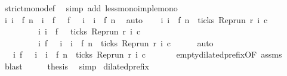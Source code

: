\begin{isabellebody}
\ strict{\isacharunderscore}mono{\isacharunderscore}def\ \isamarkupfalse%
\ {\isacharparenleft}simp\ add{\isacharcolon}\ less{\isacharunderscore}mono{\isacharunderscore}imp{\isacharunderscore}le{\isacharunderscore}mono{\isacharparenright}\isanewline
\ \ \isamarkupfalse%
\ {\isacartoucheopen}{\isasymforall}i{\isachardot}\ i\ {\isasymle}\ f\ n\ {\isacharequal}\ {\isacharparenleft}i\ {\isacharless}\ f\ {}{\isacharparenright}\ {\isasymor}\ {\isacharparenleft}f\ {}\ {\isasymle}\ i\ {\isasymand}\ i\ {\isasymle}\ f\ n{\isacharparenright}{\isacartoucheclose}\ \isamarkupfalse%
\ auto\isanewline
\ \ \isamarkupfalse%
\ {\isacartoucheopen}{\isacharbraceleft}i{\isachardot}\ i\ {\isasymle}\ f\ n\ {\isasymand}\ ticks\ {\isacharparenleft}{\isacharparenleft}Rep{\isacharunderscore}run\ r{\isacharparenright}\ i\ c{\isacharparenright}{\isacharbraceright}\isanewline
\ \ \ \ \ \ \ \ {\isacharequal}\ {\isacharbraceleft}i{\isachardot}\ i\ {\isacharless}\ f\ {}\ {\isasymand}\ ticks\ {\isacharparenleft}{\isacharparenleft}Rep{\isacharunderscore}run\ r{\isacharparenright}\ i\ c{\isacharparenright}{\isacharbraceright}\isanewline
\ \ \ \ \ \ \ \ {\isasymunion}\ {\isacharbraceleft}i{\isachardot}\ f\ {}\ {\isasymle}\ i\ {\isasymand}\ i\ {\isasymle}\ f\ n\ {\isasymand}\ ticks\ {\isacharparenleft}{\isacharparenleft}Rep{\isacharunderscore}run\ r{\isacharparenright}\ i\ c{\isacharparenright}{\isacharbraceright}{\isacartoucheclose}\isanewline
\ \ \ \ \isamarkupfalse%
\ auto\isanewline
\ \ \isamarkupfalse%
\ \isamarkupfalse%
\ {\isacartoucheopen}{\isachardot}{\isachardot}{\isachardot}\ {\isacharequal}\ {\isacharbraceleft}i{\isachardot}\ f\ {}\ {\isasymle}\ i\ {\isasymand}\ i\ {\isasymle}\ f\ n\ {\isasymand}\ ticks\ {\isacharparenleft}{\isacharparenleft}Rep{\isacharunderscore}run\ r{\isacharparenright}\ i\ c{\isacharparenright}{\isacharbraceright}{\isacartoucheclose}\isanewline
\ \ \ \ \ \isamarkupfalse%
\ empty{\isacharunderscore}dilated{\isacharunderscore}prefix{\isacharbrackleft}OF\ assms{\isacharbrackright}\ \isamarkupfalse%
\ blast\isanewline
\ \ \isamarkupfalse%
\ \isamarkupfalse%
\ {\isacharquery}thesis\ \isamarkupfalse%
\ simp\isanewline
{}\isamarkupfalse%
%
\endisatagproof
{\isafoldproof}%
%
\isadelimproof
\isanewline
%
\endisadelimproof
\isanewline
{}\isamarkupfalse%
\ dilated{\isacharunderscore}prefix{\isacharcolon}\isanewline

\end{isabellebody}
